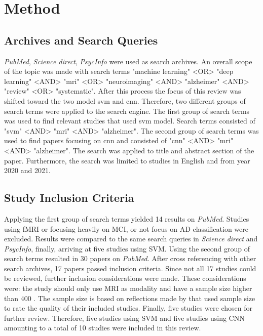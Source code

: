 \section{Method} \label{Methoden} 
\subsection{Archives and Search Queries}
\textit{PubMed}, \textit{Science direct}, \textit{PsycInfo} were used as search archives. An overall scope of the topic was made with search terms "machine learning" <OR> "deep learning" <AND> "mri" <OR> "neuroimaging" <AND> "alzheimer" <AND> "review" <OR> "systematic". After this process the focus of this review was shifted toward the two model \gls{svm} and \gls{cnn}. Therefore, two different groups of search terms were applied to the search engine. The first group of search terms was used to find relevant studies that used \gls{svm} model. Search terms consisted of "svm" <AND> "mri" <AND> "alzheimer". The second group of search terms was used to find papers focusing on \gls{cnn} and consisted of "cnn" <AND> "mri" <AND> "alzheimer". The search was applied to title and abstract section of the paper. Furthermore, the search was limited to studies in English and from year 2020 and 2021. 

\subsection{Study Inclusion Criteria}
Applying the first group of search terms yielded 14 results on \textit{PubMed}. Studies using fMRI or focusing heavily on MCI, or not focus on \gls{AD} classification were excluded. Results were compared to the same search queries in \textit{Science direct} and \textit{PsycInfo}, finally, arriving at five studies using SVM. 
Using the second group of search terms resulted in 30 papers on \textit{PubMed}. After cross referencing with other search archives, 17 papers passed inclusion criteria. Since not all 17 studies could be reviewed, further inclusion considerations were made. 
These considerations were: the study should only use MRI as modality and have a sample size higher than 400 . The sample size is based on reflections made by \autocite{ebrahimighahnaviehDeepLearningDetect2020} that used sample size to rate the quality of their included studies. Finally, five studies were chosen for further review. Therefore, five studies using SVM and five studies using CNN amounting to a total of 10 studies were included in this review. 